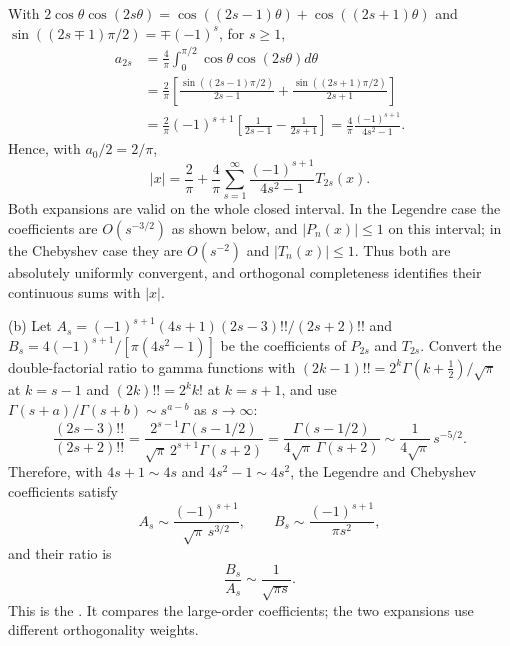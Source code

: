 With $2\cos\theta\cos(2s\theta)=\cos((2s-1)\theta)+\cos((2s+1)\theta)$
and $\sin((2s\mp1)\pi/2)=\mp(-1)^s$, for $s\ge1$,
\begin{align*}
a_{2s}
 &=\frac4\pi\int_0^{\pi/2}\cos\theta\cos(2s\theta)d\theta\\
 &=\frac2\pi\left[
  \frac{\sin((2s-1)\pi/2)}{2s-1}
 +\frac{\sin((2s+1)\pi/2)}{2s+1}\right]\\
 &=\frac2\pi(-1)^{s+1}
      \left[\frac1{2s-1}-\frac1{2s+1}\right]
 =\frac4\pi\frac{(-1)^{s+1}}{4s^2-1}.
\end{align*}
Hence, with $a_0/2=2/\pi$,
\[
\boxed{|x|=\frac2\pi+\frac4\pi\sum_{s=1}^\infty
 \frac{(-1)^{s+1}}{4s^2-1}T_{2s}(x)}.
\]
Both expansions are valid on the whole closed interval.  In the
Legendre case the coefficients are $O(s^{-3/2})$ as shown below,
and $|P_n(x)|\le1$ on this interval; in the Chebyshev case they
are $O(s^{-2})$ and $|T_n(x)|\le1$.  Thus both are absolutely
uniformly convergent, and orthogonal completeness identifies their
continuous sums with $|x|$.

(b) Let $A_s=(-1)^{s+1}(4s+1)(2s-3)!!/(2s+2)!!$ and
$B_s=4(-1)^{s+1}/[\pi(4s^2-1)]$ be the coefficients of $P_{2s}$ and
$T_{2s}$.  Convert the double-factorial ratio to gamma functions with
$(2k-1)!!=2^k\Gamma(k+\frac12)/\sqrt\pi$ at $k=s-1$ and
$(2k)!!=2^kk!$ at $k=s+1$, and use
$\Gamma(s+a)/\Gamma(s+b)\sim s^{a-b}$ as $s\to\infty$:
\[
\frac{(2s-3)!!}{(2s+2)!!}
 =\frac{2^{s-1}\Gamma(s-1/2)}{\sqrt\pi\,2^{s+1}\Gamma(s+2)}
 =\frac{\Gamma(s-1/2)}{4\sqrt\pi\,\Gamma(s+2)}
 \sim\frac1{4\sqrt\pi}\,s^{-5/2}.
\]
Therefore, with $4s+1\sim4s$ and $4s^2-1\sim4s^2$, the Legendre and
Chebyshev coefficients satisfy
\[
A_s\sim\frac{(-1)^{s+1}}{\sqrt\pi\,s^{3/2}},\qquad
B_s\sim\frac{(-1)^{s+1}}{\pi s^2},
\]
and their ratio is
\[
\boxed{\frac{B_s}{A_s}\sim\frac1{\sqrt{\pi s}}}.
\]
This is the .  It compares the large-order coefficients; the two
expansions use different orthogonality weights.

